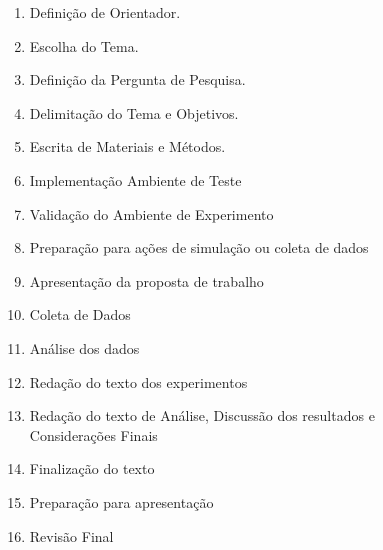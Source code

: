 \documentclass{article}
\begin{document}
\begin{figure}[h]
	\begin{enumerate}[nosep, label=\arabic*)]
		\item Definição de Orientador. %
  
		\item Escolha do Tema. %
		
		\item Definição da Pergunta de Pesquisa. %
		
		\item Delimitação do Tema e Objetivos. %
		
		\item Escrita de Materiais e Métodos. %
		
        \item Implementação Ambiente de Teste %
        
        \item Validação do Ambiente de Experimento %
        
        \item Preparação para ações de simulação ou coleta de dados %

        \item Apresentação da proposta de trabalho %
        
        \item Coleta de Dados %
        
        \item Análise dos dados %
        
        \item Redação do texto dos experimentos %
        
        \item Redação do texto de Análise, Discussão dos resultados e Considerações Finais %
        
        \item Finalização do texto %
        
        \item Preparação para apresentação %
        
        \item Revisão Final %

	\end{enumerate}
	
	\label{fig:gantt-schedule}
	
\end{figure}


\pagebreak
\end{document}
